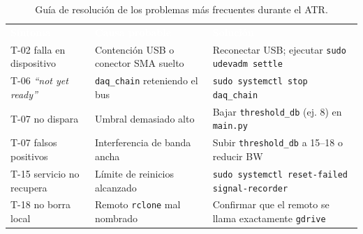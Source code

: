 \begin{table}[h]
    \centering
    \renewcommand{\arraystretch}{1.8}
    \begin{tabularx}{\textwidth}{l >{\hsize=0.8\hsize}X >{\hsize=1.2\hsize}X}
        \rowcolor{deyposcolor}
        \textbf{\textcolor{white}{Síntoma}} &
        \textbf{\textcolor{white}{Causa probable}} &
        \textbf{\textcolor{white}{Solución}} \\
        
        T-02 falla en dispositivo & Contención USB o conector SMA suelto & Reconectar USB; ejecutar \texttt{sudo udevadm settle} \\
        \rowcolor[gray]{0.95}
        T-06 \textit{``not yet ready''} & \texttt{daq\_chain} reteniendo el bus & \texttt{sudo systemctl stop daq\_chain} \\
        T-07 no dispara & Umbral demasiado alto & Bajar \texttt{threshold\_db} (ej. 8) en \texttt{main.py} \\
        \rowcolor[gray]{0.95}
        T-07 falsos positivos & Interferencia de banda ancha & Subir \texttt{threshold\_db} a 15--18 o reducir BW \\
        T-15 servicio no recupera & Límite de reinicios alcanzado & \texttt{sudo systemctl reset-failed signal-recorder} \\
        \rowcolor[gray]{0.95}
        T-18 no borra local & Remoto \texttt{rclone} mal nombrado & Confirmar que el remoto se llama exactamente \texttt{gdrive} \\
        \bottomrule
    \end{tabularx}
    \caption{Guía de resolución de los problemas más frecuentes durante el ATR.}
\end{table}
